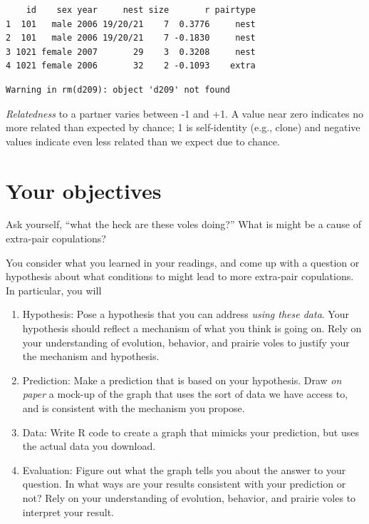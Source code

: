 \documentclass[
  letterpaper,
  DIV=11,
  numbers=noendperiod]{scrreprt}
\providecommand{\tightlist}{%
  \setlength{\itemsep}{0pt}\setlength{\parskip}{0pt}}
\begin{document}
\begin{verbatim}
    id    sex year     nest size       r pairtype
1  101   male 2006 19/20/21    7  0.3776     nest
2  101   male 2006 19/20/21    7 -0.1830     nest
3 1021 female 2007       29    3  0.3208     nest
4 1021 female 2006       32    2 -0.1093    extra
\end{verbatim}

\begin{verbatim}
Warning in rm(d209): object 'd209' not found
\end{verbatim}

\emph{Relatedness} to a partner varies between -1 and +1. A value near
zero indicates no more related than expected by chance; 1 is
self-identity (e.g., clone) and negative values indicate even less
related than we expect due to chance.

\section{Your objectives}\label{your-objectives}

Ask yourself, ``what the heck are these voles doing?'' What is might be
a cause of extra-pair copulations?

You consider what you learned in your readings, and come up with a
question or hypothesis about what conditions to might lead to more
extra-pair copulations. In particular, you will

\begin{enumerate}
\def\labelenumi{\arabic{enumi}.}
\tightlist
\item
  Hypothesis: Pose a hypothesis that you can address \emph{using these
  data}. Your hypothesis should reflect a mechanism of what you think is
  going on. Rely on your understanding of evolution, behavior, and
  prairie voles to justify your the mechanism and hypothesis.
\item
  Prediction: Make a prediction that is based on your hypothesis. Draw
  \emph{on paper} a mock-up of the graph that uses the sort of data we
  have access to, and is consistent with the mechanism you propose.
\item
  Data: Write R code to create a graph that mimicks your prediction, but
  uses the actual data you download.
\item
  Evaluation: Figure out what the graph tells you about the answer to
  your question. In what ways are your results consistent with your
  prediction or not? Rely on your understanding of evolution, behavior,
  and prairie voles to interpret your result.
\end{enumerate}
\end{document}
